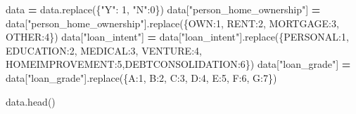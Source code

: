 \documentclass[
]{book}
\newenvironment{Shaded}{\begin{snugshade}}{\end{snugshade}}
\newcommand{\DecValTok}[1]{\textcolor[rgb]{0.00,0.00,0.81}{#1}}
\newcommand{\NormalTok}[1]{#1}
\newcommand{\OperatorTok}[1]{\textcolor[rgb]{0.81,0.36,0.00}{\textbf{#1}}}
\newcommand{\StringTok}[1]{\textcolor[rgb]{0.31,0.60,0.02}{#1}}
\begin{document}
\begin{Shaded}
\begin{Highlighting}[]
\NormalTok{data }\OperatorTok{=}\NormalTok{ data.replace(\{}\StringTok{"Y"}\NormalTok{: }\DecValTok{1}\NormalTok{, }\StringTok{"N"}\NormalTok{:}\DecValTok{0}\NormalTok{\})}
\NormalTok{data[}\StringTok{"person\_home\_ownership"}\NormalTok{] }\OperatorTok{=}\NormalTok{ data[}\StringTok{"person\_home\_ownership"}\NormalTok{].replace(\{}\StringTok{\textquotesingle{}OWN\textquotesingle{}}\NormalTok{:}\DecValTok{1}\NormalTok{, }\StringTok{\textquotesingle{}RENT\textquotesingle{}}\NormalTok{:}\DecValTok{2}\NormalTok{, }\StringTok{\textquotesingle{}MORTGAGE\textquotesingle{}}\NormalTok{:}\DecValTok{3}\NormalTok{, }\StringTok{\textquotesingle{}OTHER\textquotesingle{}}\NormalTok{:}\DecValTok{4}\NormalTok{\})}
\NormalTok{data[}\StringTok{"loan\_intent"}\NormalTok{] }\OperatorTok{=}\NormalTok{ data[}\StringTok{"loan\_intent"}\NormalTok{].replace(\{}\StringTok{\textquotesingle{}PERSONAL\textquotesingle{}}\NormalTok{:}\DecValTok{1}\NormalTok{, }\StringTok{\textquotesingle{}EDUCATION\textquotesingle{}}\NormalTok{:}\DecValTok{2}\NormalTok{, }\StringTok{\textquotesingle{}MEDICAL\textquotesingle{}}\NormalTok{:}\DecValTok{3}\NormalTok{, }\StringTok{\textquotesingle{}VENTURE\textquotesingle{}}\NormalTok{:}\DecValTok{4}\NormalTok{, }\StringTok{\textquotesingle{}HOMEIMPROVEMENT\textquotesingle{}}\NormalTok{:}\DecValTok{5}\NormalTok{,}\StringTok{\textquotesingle{}DEBTCONSOLIDATION\textquotesingle{}}\NormalTok{:}\DecValTok{6}\NormalTok{\})}
\NormalTok{data[}\StringTok{"loan\_grade"}\NormalTok{] }\OperatorTok{=}\NormalTok{ data[}\StringTok{"loan\_grade"}\NormalTok{].replace(\{}\StringTok{\textquotesingle{}A\textquotesingle{}}\NormalTok{:}\DecValTok{1}\NormalTok{, }\StringTok{\textquotesingle{}B\textquotesingle{}}\NormalTok{:}\DecValTok{2}\NormalTok{, }\StringTok{\textquotesingle{}C\textquotesingle{}}\NormalTok{:}\DecValTok{3}\NormalTok{, }\StringTok{\textquotesingle{}D\textquotesingle{}}\NormalTok{:}\DecValTok{4}\NormalTok{, }\StringTok{\textquotesingle{}E\textquotesingle{}}\NormalTok{:}\DecValTok{5}\NormalTok{, }\StringTok{\textquotesingle{}F\textquotesingle{}}\NormalTok{:}\DecValTok{6}\NormalTok{, }\StringTok{\textquotesingle{}G\textquotesingle{}}\NormalTok{:}\DecValTok{7}\NormalTok{\})}

\NormalTok{data.head()}
\end{Highlighting}
\end{Shaded}
\end{document}
